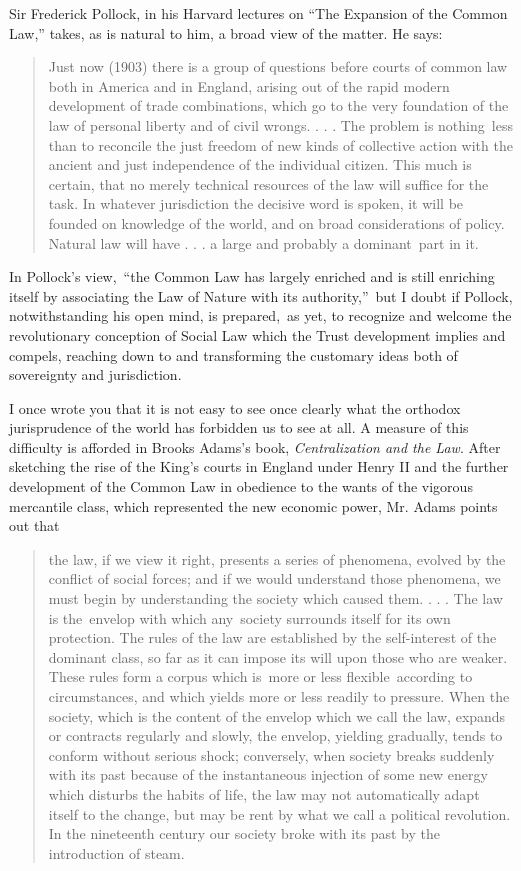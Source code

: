 \documentclass[twoside,symmetric,nobib,justified]{tufte-book}
\begin{document}
Sir Frederick Pollock, in his Harvard lectures on \textquotesingle``The
Expansion of the Common Law,'' takes, as is natural to him, a broad view
of the matter. He says:~

\begin{quote}
Just now (1903) there is a group of questions before courts of common
law both in America and in England, arising out of the rapid modern
development of trade combinations, which go to the very foundation of
the law of personal liberty and of civil wrongs. . . . The problem is
nothing~less than to reconcile the just freedom of new kinds of
collective action with the ancient and just independence of the
individual citizen. This much is certain, that no merely technical
resources of the law will suffice for the task. In whatever jurisdiction
the decisive word is spoken, it will be founded on knowledge of the
world, and on broad considerations of policy. Natural law will have . .
. a large and probably a dominant~part in it.
\end{quote}

In Pollock's view,~``the Common Law has largely enriched and is still
enriching itself by associating the Law of Nature with its
authority,''~but I doubt if Pollock, notwithstanding his open mind, is
prepared,~as yet, to recognize and welcome the revolutionary conception
of Social Law which the Trust development implies and compels, reaching
down to and transforming the customary ideas both of sovereignty and
jurisdiction.~

I once wrote you that it is not easy to see once clearly what the
orthodox jurisprudence of the world has forbidden us to see at all. A
measure of this difficulty is afforded in Brooks Adams's book,
\emph{Centralization and the Law}. After sketching the rise of the
King's courts in England under Henry II and the further development of
the Common Law in obedience to the wants of the vigorous mercantile
class, which represented the new economic power, Mr. Adams points out
that~

\begin{quote}
the law, if we view it right, presents a series of phenomena, evolved by
the conflict of social forces; and if we would understand those
phenomena, we must begin by understanding the society which caused them.
. . . The law is the~envelop with which any~society surrounds itself for
its own protection. The rules of the law are established by the
self-interest of the dominant class, so far as it can impose its will
upon those who are weaker. These rules form a corpus which is~more or
less flexible~according to circumstances, and which yields more or less
readily to pressure. When the society, which is the content of the
envelop which we call the law, expands or contracts regularly and
slowly, the envelop, yielding gradually, tends to conform without
serious shock; conversely, when society breaks suddenly with its past
because of the instantaneous injection of some new energy which disturbs
the habits of life, the law may not automatically adapt itself to the
change, but may be rent by what we call a political revolution. In the
nineteenth century our society broke with its past by the introduction
of steam.~
\end{quote}
\end{document}
